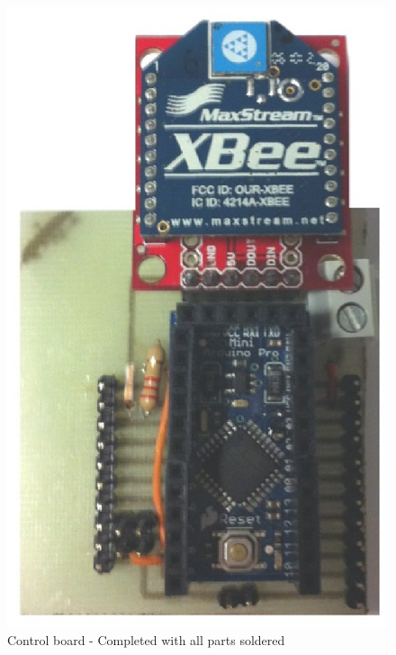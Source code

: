 \documentclass[12pt,a4paper]{report}
\begin{document}
\begin{figure}[H]
\centering
	\includegraphics*[scale=0.22]{control_brd_complete}
	\caption{Control board - Completed with all parts soldered}
	\label{Control_brd_complete}
\end{figure}
\ \\
\end{document}
